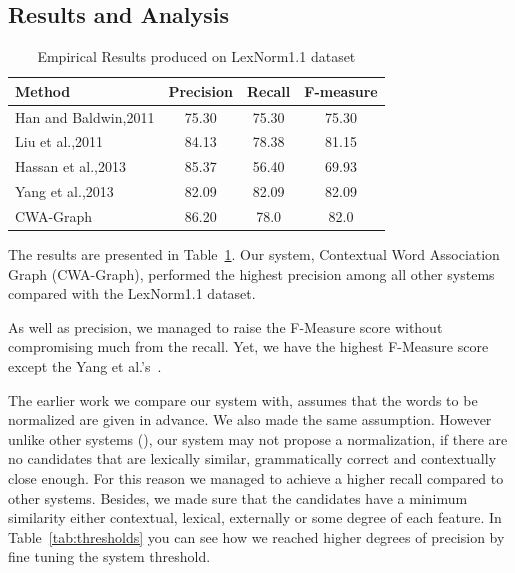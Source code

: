 \documentclass[preprint,review,12pt]{elsarticle}
\begin{document}
\subsection{Results and Analysis}

\begin{table}[thb]
  \centering
  \begin{tabular}[t]{lccc}
    \hline
    Method & Precision & Recall & F-measure \\
    \hline
    Han and Baldwin,2011 & 75.30 & 75.30 & 75.30 \\
    Liu et al.,2011 & 84.13 & 78.38 & 81.15 \\
    Hassan et al.,2013 & 85.37 & 56.40 & 69.93 \\
    Yang et al.,2013 & 82.09 & 82.09 & 82.09 \\
    CWA-Graph   & 86.20 & 78.0 & 82.0 \\
    \hline
  \end{tabular}
  \caption{Empirical Results produced on LexNorm1.1 dataset}
  \label{tab:results}
\end{table}

The results are presented in Table~\ref{tab:results}. Our system, Contextual Word Association Graph (CWA-Graph), performed the highest precision among all other systems compared with the LexNorm1.1 dataset.

As well as precision, we managed to raise the F-Measure score without compromising much from the recall. Yet, we have the highest F-Measure score except the Yang et al.'s~\cite{DBLP:conf/wsdm/YangL11}.

The earlier work we compare our system with, assumes that the words to be normalized are given in advance. We also made the same assumption. However unlike other systems (\cite{DBLP:conf/wsdm/YangL11, liu2012broad, Han:2011:LNS:2002472.2002520}), our system may not propose a normalization, if there are no candidates that are lexically similar, grammatically correct and contextually close enough. For this reason we managed to achieve a higher recall compared to other systems. Besides, we made sure that the candidates have a minimum similarity either contextual, lexical, externally or some degree of each feature. In Table~\ref{tab:thresholds} you can see how we reached higher degrees of precision by fine tuning the system threshold.
\end{document}
